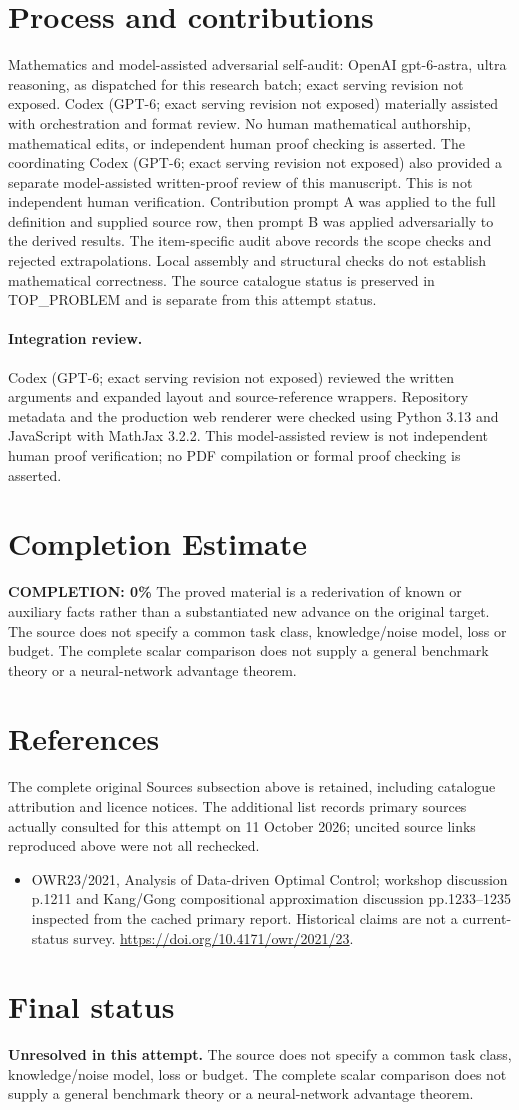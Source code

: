 \documentclass[11pt]{article}
\begin{document}
\section{Process and contributions}
Mathematics and model-assisted adversarial self-audit: OpenAI gpt-6-astra, ultra reasoning, as dispatched for this research batch; exact serving revision not exposed. Codex (GPT-6; exact serving revision not exposed) materially assisted with orchestration and format review. No human mathematical authorship, mathematical edits, or independent human proof checking is asserted.
The coordinating Codex (GPT-6; exact serving revision not exposed) also provided a separate model-assisted written-proof review of this manuscript. This is not independent human verification.
Contribution prompt A was applied to the full definition and supplied source row, then prompt B was applied adversarially to the derived results. The item-specific audit above records the scope checks and rejected extrapolations. Local assembly and structural checks do not establish mathematical correctness. The source catalogue status is preserved in TOP\_PROBLEM and is separate from this attempt status.
\paragraph{Integration review.} Codex (GPT-6; exact serving revision not exposed) reviewed the written arguments and expanded layout and source-reference wrappers. Repository metadata and the production web renderer were checked using Python 3.13 and JavaScript with MathJax 3.2.2. This model-assisted review is not independent human proof verification; no PDF compilation or formal proof checking is asserted.

\section{Completion Estimate}
\noindent\textbf{COMPLETION: 0\%}
The proved material is a rederivation of known or auxiliary facts rather than a substantiated new advance on the original target. The source does not specify a common task class, knowledge/noise model, loss or budget. The complete scalar comparison does not supply a general benchmark theory or a neural-network advantage theorem.
\section{References}
The complete original Sources subsection above is retained, including catalogue attribution and licence notices. The additional list records primary sources actually consulted for this attempt on 11 October 2026; uncited source links reproduced above were not all rechecked.
\begin{itemize}
\item OWR23/2021, Analysis of Data-driven Optimal Control; workshop discussion p.1211 and Kang/Gong compositional approximation discussion pp.1233–1235 inspected from the cached primary report. Historical claims are not a current-status survey. \url{https://doi.org/10.4171/owr/2021/23}.
\end{itemize}
\section{Final status}
\textbf{Unresolved in this attempt.} The source does not specify a common task class, knowledge/noise model, loss or budget. The complete scalar comparison does not supply a general benchmark theory or a neural-network advantage theorem.
\end{document}

